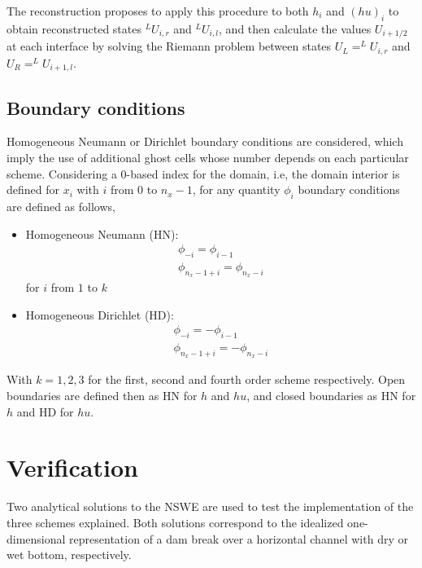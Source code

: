  The reconstruction proposes to apply this procedure to both $h_i$ and $(hu)_i$ to obtain reconstructed states $^LU_{i,r}$ and $^LU_{i,l}$, and then calculate the values $U_{i+1/2}$ at each interface by solving the Riemann problem between states $U_L=^LU_{i,r}$ and $U_R = ^LU_{i+1,l}$.

\subsection{Boundary conditions}
\label{nswe:bcs}

Homogeneous Neumann or Dirichlet boundary conditions are considered, which imply the use of additional ghost cells whose number depends on each particular scheme. Considering a 0-based index for the domain, i.e, the domain interior is defined for $x_i$ with $i$ from $0$ to $n_x-1$, for any quantity $\phi_i$ boundary conditions are defined as follows,

\begin{itemize}
	\item Homogeneous Neumann (HN): \begin{equation}
		\begin{split}
			\phi_{-i} = \phi_{i-1} \\
			\phi_{n_x-1+i} = \phi_{n_x-i}
		\end{split}
		\label{nswe:neumann}
	\end{equation}
	for $i$ from $1$ to $k$

	\item Homogeneous Dirichlet (HD): \begin{equation}
		\begin{split}
			\phi_{-i} = -\phi_{i-1} \\
			\phi_{n_x-1+i} = -\phi_{n_x-i}
		\end{split}
	\end{equation}
\end{itemize}

With $k=1, 2, 3$ for the first, second and fourth order scheme respectively. Open boundaries are defined then as HN for $h$ and $hu$, and closed boundaries as HN for $h$ and HD for $hu$.

\section{Verification}

Two analytical solutions to the NSWE are used to test the implementation of the three schemes explained. Both solutions correspond to the idealized one-dimensional representation of a dam break over a horizontal channel with dry or wet bottom, respectively. 

